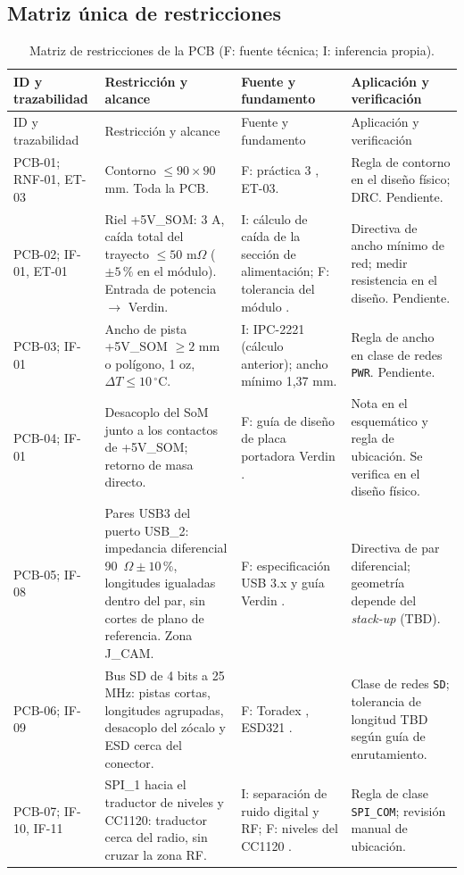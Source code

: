 \documentclass[11pt,letterpaper]{article}
\begin{document}
\subsection{Matriz única de restricciones}
\small
\begin{longtable}{L{2.5cm}L{4.5cm}L{4.1cm}L{4.4cm}}
\caption{Matriz de restricciones de la PCB (F: fuente técnica; I: inferencia propia).}\label{tab:pcb}\\
\toprule ID y trazabilidad & Restricción y alcance & Fuente y fundamento & Aplicación y verificación \\
\midrule\endfirsthead
\toprule ID y trazabilidad & Restricción y alcance & Fuente y fundamento & Aplicación y verificación \\
\midrule\endhead
PCB-01; RNF-01, ET-03 & Contorno $\leq90\times90$ mm. Toda la PCB. & F: práctica 3 \cite{lab3}, ET-03. & Regla de contorno en el diseño físico; DRC. Pendiente. \\
PCB-02; IF-01, ET-01 & Riel +5V\_SOM: 3 A, caída total del trayecto $\leq50$ m$\Omega$ ($\pm5\,\%$ en el módulo). Entrada de potencia $\to$ Verdin. & I: cálculo de caída de la sección de alimentación; F: tolerancia del módulo \cite{verdinds}. & Directiva de ancho mínimo de red; medir resistencia en el diseño. Pendiente. \\
PCB-03; IF-01 & Ancho de pista +5V\_SOM $\geq2$ mm o polígono, 1 oz, $\Delta T\leq10\,^\circ$C. & I: IPC-2221 (cálculo anterior); ancho mínimo 1,37 mm. & Regla de ancho en clase de redes \texttt{PWR}. Pendiente. \\
PCB-04; IF-01 & Desacoplo del SoM junto a los contactos de +5V\_SOM; retorno de masa directo. & F: guía de diseño de placa portadora Verdin \cite{verdinguide}. & Nota en el esquemático y regla de ubicación. Se verifica en el diseño físico. \\
PCB-05; IF-08 & Pares USB3 del puerto USB\_2: impedancia diferencial 90~$\Omega\pm10\,\%$, longitudes igualadas dentro del par, sin cortes de plano de referencia. Zona J\_CAM. & F: especificación USB 3.x y guía Verdin \cite{verdinguide}. & Directiva de par diferencial; geometría depende del \emph{stack-up} (TBD). \\
PCB-06; IF-09 & Bus SD de 4 bits a 25 MHz: pistas cortas, longitudes agrupadas, desacoplo del zócalo y ESD cerca del conector. & F: Toradex \cite{toradexsd}, ESD321 \cite{esd321}. & Clase de redes \texttt{SD}; tolerancia de longitud TBD según guía de enrutamiento. \\
PCB-07; IF-10, IF-11 & SPI\_1 hacia el traductor de niveles y CC1120: traductor cerca del radio, sin cruzar la zona RF. & I: separación de ruido digital y RF; F: niveles del CC1120 \cite{cc1120}. & Regla de clase \texttt{SPI\_COM}; revisión manual de ubicación. \\

\end{longtable}
\end{document}
